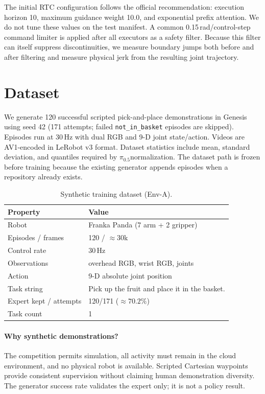 \documentclass[10pt,twocolumn]{article}
\newcommand{\pifive}{$\pi_{0.5}$}
\begin{document}
The initial RTC configuration follows the official recommendation:
execution horizon 10, maximum guidance weight 10.0, and exponential prefix
attention.  We do not tune these values on the test manifest.  A common
0.15\,rad/control-step command limiter is applied after all executors as a
safety filter.  Because this filter can itself suppress discontinuities, we
measure boundary jumps both before and after filtering and measure physical
jerk from the resulting joint trajectory.

\section{Dataset}

We generate 120 successful scripted pick-and-place demonstrations in Genesis
using seed 42 (171 attempts; failed \texttt{not\_in\_basket} episodes are
skipped).  Episodes run at 30\,Hz with dual RGB and 9-D joint state/action.
Videos are AV1-encoded in LeRobot v3 format.  Dataset statistics include mean,
standard deviation, and quantiles required by \pifive normalization.  The
dataset path is frozen before training because the existing generator appends
episodes when a repository already exists.

\begin{table}[t]
\centering
\caption{Synthetic training dataset (Env-A).}
\label{tab:data}
\small
\begin{tabular}{ll}
\toprule
Property & Value \\
\midrule
Robot & Franka Panda (7 arm + 2 gripper) \\
Episodes / frames & 120 / $\approx$30k \\
Control rate & 30\,Hz \\
Observations & overhead RGB, wrist RGB, joints \\
Action & 9-D absolute joint position \\
Task string & Pick up the fruit and place it in the basket. \\
Expert kept / attempts & 120/171 ($\approx70.2\%$) \\
Task count & 1 \\
\bottomrule
\end{tabular}
\end{table}

\paragraph{Why synthetic demonstrations?}
The competition permits simulation, all activity must remain in the cloud
environment, and no physical robot is available.  Scripted Cartesian
waypoints provide consistent supervision without claiming human demonstration
diversity.  The generator success rate validates the expert only; it is not a
policy result.
\end{document}
